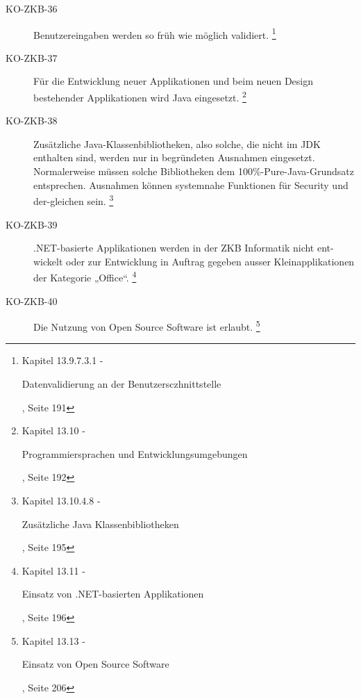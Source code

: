 \documentclass[
11pt, %
a4paper, %
BCOR25mm, %
DIV14, %
footsepline = false, %
headsepline, %
twoside, %
openright,
abstracton, %
listof=totocnumbered, %
bibliography=totocnumbered %
]{scrreprt}
\begin{document}
\begin{description}
    \item[KO-ZKB-36] Benutzereingaben werden so früh wie möglich validiert.
    \footnote{\cite{ZkbHandbuchDerItArchitektur} Kapitel 13.9.7.3.1 -
    \begin{itshape}Datenvalidierung an der Benutzersczhnittstelle\end{itshape},
    Seite 191}
    
    \item[KO-ZKB-37] Für die Entwicklung neuer Applikationen und beim neuen
    Design bestehender Applikationen wird Java eingesetzt.
    \footnote{\cite{ZkbHandbuchDerItArchitektur} Kapitel 13.10 -
    \begin{itshape}Programmiersprachen und Entwicklungsumgebungen\end{itshape},
    Seite 192}
    
    \item[KO-ZKB-38] Zusätzliche Java-Klassenbibliotheken, also solche, die
    nicht im JDK enthalten sind, werden nur in begründeten Ausnahmen eingesetzt.
    Normalerweise müssen solche Bibliotheken dem 100\%-Pure-Java-Grundsatz
    entsprechen. Ausnahmen können systemnahe Funktionen für Security und
    der-gleichen sein.
    \footnote{\cite{ZkbHandbuchDerItArchitektur} Kapitel 13.10.4.8 -
    \begin{itshape}Zusätzliche Java Klassenbibliotheken\end{itshape}, Seite 195}
    
    \item[KO-ZKB-39] .NET-basierte Applikationen werden in der ZKB Informatik
    nicht ent-wickelt oder zur Entwicklung in Auftrag gegeben ausser
    Kleinapplikationen der Kategorie „Office“.
    \footnote{\cite{ZkbHandbuchDerItArchitektur} Kapitel 13.11 -
    \begin{itshape}Einsatz von .NET-basierten Applikationen\end{itshape}, Seite
    196}
    
    \item[KO-ZKB-40] Die Nutzung von Open Source Software ist erlaubt.
    \footnote{\cite{ZkbHandbuchDerItArchitektur} Kapitel 13.13 -
    \begin{itshape}Einsatz von Open Source Software\end{itshape}, Seite 206}
    

\end{description}
\end{document}
